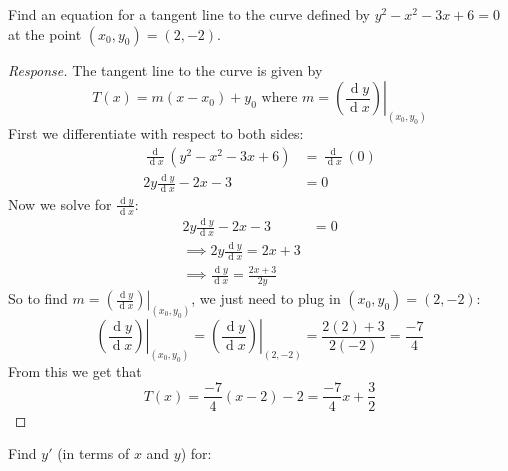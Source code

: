 \documentclass[11pt]{exam}
\renewcommand{\d}[1]{\ensuremath{\operatorname{d}\!{#1}}}
\newcommand{\dydx}[2]{\frac{\d #1}{\d #2}}
\newcommand{\ddx}[1]{\frac{\d{}}{\d{#1}}}
\newcommand{\evat}[3]{\left. #1\right|_{#2}^{#3}}
\newcommand{\restr}[2]{\evat{#1}{#2}{}}
\begin{document}
\begin{questions}

\addpoints
\question[10] Find an equation for a tangent line to the curve defined by $y^2-x^2-3x+6=0$ at the point $(x_0,y_0)=(2,-2)$.
\begin{proof}[Response]
	The tangent line to the curve is given by $$T(x)=m(x-x_0)+y_0\text{ where } m=\restr{\left(\dydx{y}{x}\right)}{(x_0,y_0)}$$ 
	First we differentiate with respect to both sides:\begin{align*}
		\ddx{x}(y^2-x^2-3x+6)&=\ddx{x}(0)\\
		2y\dydx{y}{x}-2x-3&=0
	\end{align*}
	Now we solve for $\dydx{y}{x}$:
	\begin{align*}
		2y\dydx{y}{x}-2x-3&=0\\
		\implies 2y\dydx{y}{x}=2x+3\\
		\implies \dydx{y}{x}=\frac{2x+3}{2y}
	\end{align*}
	So to find $m=\displaystyle{\restr{\left(\dydx{y}{x}\right)}{(x_0,y_0)}}$, we just need to plug in $(x_0,y_0)=(2,-2)$:
	$$\restr{\left(\dydx{y}{x}\right)}{(x_0,y_0)}=\restr{\left(\dydx{y}{x}\right)}{(2,-2)}=\frac{2(2)+3}{2(-2)}=\frac{-7}{4}$$
	From this we get that $$T(x)=\frac{-7}{4}(x-2)-2=\frac{-7}{4}x+\frac{3}{2}$$
\end{proof}
\vspace{.25in}
\addpoints
\question Find $y'$ (in terms of $x$ and $y$) for:
\begin{parts}

\end{parts}
\end{questions}
\end{document}
